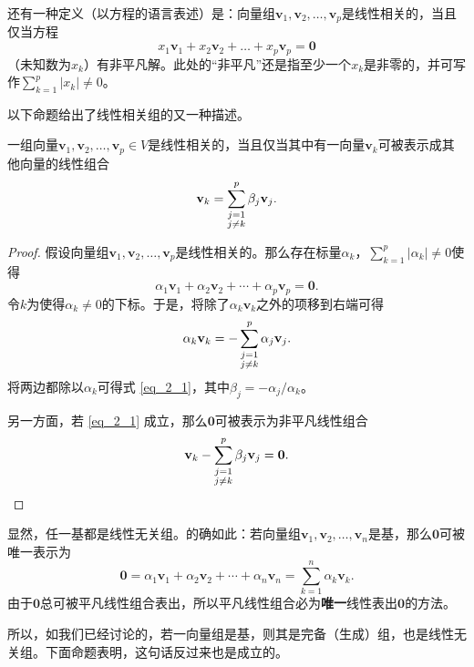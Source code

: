 还有一种定义（以方程的语言表述）是：向量组$\mathbf{v}_{1},\mathbf{v}_{2},\ldots,\mathbf{v}_{p}$是线性相关的，当且仅当方程\[x_1\mathbf{v}_1+x_2\mathbf{v}_2+\ldots+x_p\mathbf{v}_p=\mathbf{0}\]
（未知数为$x_k$）有非平凡解。此处的“非平凡”还是指至少一个$x_{k}$是非零的，并可写作$\sum_{k=1}^{p}|x_{k}|\neq0$。

以下命题给出了线性相关组的又一种描述。
\begin{proposition}
    一组向量$\mathbf{v}_{1},\mathbf{v}_{2},\ldots,\mathbf{v}_{p}\in V$是线性相关的，当且仅当其中有一向量$\mathbf{v}_{k}$可被表示成其他向量的线性组合
    \begin{equation}\label{eq_2_1}
        \mathbf{v}_k=\sum_{\begin{subarray}{c}j=1\\j\neq k\end{subarray}}^p\beta_j\mathbf{v}_j.
    \end{equation}
\end{proposition}
\begin{proof}
    假设向量组$\mathbf{v}_{1},\mathbf{v}_{2},\ldots,\mathbf{v}_{p}$是线性相关的。那么存在标量$\alpha_{k}$，\linebreak $\sum_{k=1}^{p}|\alpha_{k}|\neq0$使得
    \[\alpha_1\mathbf{v}_1+\alpha_2\mathbf{v}_2+\cdots+\alpha_p\mathbf{v}_p=\mathbf{0}.\]
    令$k$为使得$\alpha_k\ne 0$的下标。于是，将除了$\alpha_{k}\mathbf{v}_{k}$之外的项移到右端可得\[\alpha_k\mathbf{v}_k=-\sum_{\begin{subarray}{c}j=1\\j\neq k\end{subarray}}^p\alpha_j\mathbf{v}_j.\]
    将两边都除以$\alpha_k$可得式 \eqref{eq_2_1}，其中$\beta_j = -\alpha_j/\alpha_k$。

    另一方面，若 \eqref{eq_2_1} 成立，那么$\mathbf{0}$可被表示为非平凡线性组合\[\mathbf{v}_k-\sum_{\begin{subarray}{c}j=1\\j\neq k\end{subarray}}^p\beta_j\mathbf{v}_j=\mathbf{0}.\qedhere\]
\end{proof}

显然，任一基都是线性无关组。的确如此：若向量组$\mathbf{v}_{1},\mathbf{v}_{2},\ldots,\mathbf{v}_{n}$是基，那么$\mathbf{0}$可被唯一表示为\[\mathbf{0}=\alpha_1\mathbf{v}_1+\alpha_2\mathbf{v}_2+\cdots+\alpha_n\mathbf{v}_n=\sum_{k=1}^n\alpha_k\mathbf{v}_k.\]
由于$\mathbf{0}$总可被平凡线性组合表出，所以平凡线性组合必为{\bf 唯一}线性表出$\mathbf{0}$的方法。

所以，如我们已经讨论的，若一向量组是基，则其是完备（生成）组，也是线性无关组。下面命题表明，这句话反过来也是成立的。


